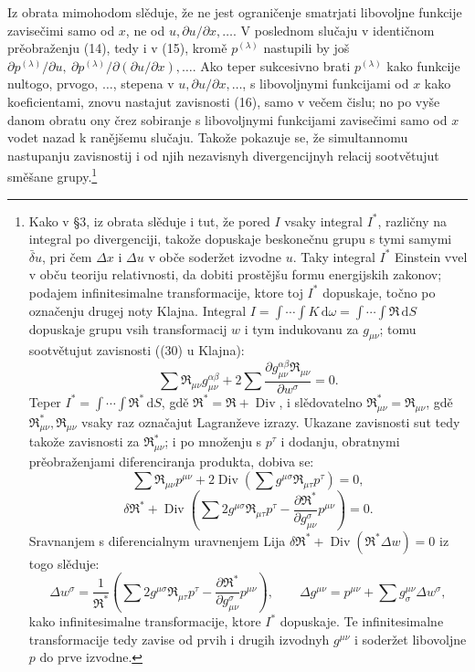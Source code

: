 \documentclass[11pt]{article}
\providecommand{\D}{\Delta}
\providecommand{\p}{\partial}
\providecommand{\dd}{\mathrm d}
\DeclareMathOperator{\Div}{Div}
\providecommand{\bd}{\bar{\delta}}
\begin{document}
Iz obrata mimohodom slěduje, že ne jest ograničenje smatrjati libovoljne funkcije zavisečimi samo od \(x\), ne od \(u,\p u/\p x,\ldots\). V poslednom slučaju v identičnom prěobraženju (14), tedy i v (15), kromě \(p^{(\lambda)}\) nastupili by još \(\p p^{(\lambda)}/\p u,\ \p p^{(\lambda)}/\p(\p u/\p x),\ldots\). Ako teper sukcesivno brati \(p^{(\lambda)}\) kako funkcije nultogo, prvogo, \(\ldots\), stepena v \(u,\p u/\p x,\ldots\), s libovoljnymi funkcijami od \(x\) kako koeficientami, znovu nastajut zavisnosti (16), samo v večem čislu; no po vyše danom obratu ony črez sobiranje s libovoljnymi funkcijami zavisečimi samo od \(x\) vodet nazad k ranějšemu slučaju. Takože pokazuje se, že simultannomu nastupanju zavisnostij i od njih nezavisnyh divergencijnyh relacij sootvětujut směšane grupy.\footnote{Kako v \S{}3, iz obrata slěduje i tut, že pored \(I\) vsaky integral \(I^*\), različny na integral po divergenciji, takože dopuskaje beskonečnu grupu s tymi samymi \(\bd u\), pri čem \(\D x\) i \(\D u\) v obče soderžet izvodne \(u\). Taky integral \(I^*\) Einstein vvel v obču teoriju relativnosti, da dobiti prostějšu formu energijskih zakonov; podajem infinitesimalne transformacije, ktore toj \(I^*\) dopuskaje, točno po označenju drugej noty Klajna. Integral \(I=\int\!\cdots\!\int K\,\dd\omega=\int\!\cdots\!\int \mathfrak{R}\,\dd S\) dopuskaje grupu vsih transformacij \(w\) i tym indukovanu za \(g_{\mu\nu}\); tomu sootvětujut zavisnosti ((30) u Klajna):
\[
\sum \mathfrak{R}_{\mu\nu}g_{\mu\nu}^{\alpha\beta}
+2\sum\frac{\p g_{\mu\nu}^{\alpha\beta}\mathfrak{R}_{\mu\nu}}{\p w^\sigma}=0.
\]
Teper \(I^*=\int\!\cdots\!\int \mathfrak{R}^*\,\dd S\), gdě \(\mathfrak{R}^*=\mathfrak{R}+\Div\), i slědovatelno \(\mathfrak{R}_{\mu\nu}^*=\mathfrak{R}_{\mu\nu}\), gdě \(\mathfrak{R}_{\mu\nu}^*,\mathfrak{R}_{\mu\nu}\) vsaky raz označajut Lagranževe izrazy. Ukazane zavisnosti sut tedy takože zavisnosti za \(\mathfrak{R}_{\mu\nu}^*\); i po množenju s \(p^\tau\) i dodanju, obratnymi prěobraženjami diferenciranja produkta, dobiva se:
\[
\sum \mathfrak{R}_{\mu\nu}p^{\mu\nu}
+2\Div\!\left(\sum g^{\mu\sigma}\mathfrak{R}_{\mu\tau}p^\tau\right)=0,
\]
\[
\delta\mathfrak{R}^*+\Div\!\left(\sum 2g^{\mu\sigma}\mathfrak{R}_{\mu\tau}p^\tau
-\frac{\p\mathfrak{R}^*}{\p g_{\mu\nu}^{\sigma}}p^{\mu\nu}\right)=0.
\]
Sravnanjem s diferencialnym uravnenjem Lija \(\delta\mathfrak{R}^*+\Div(\mathfrak{R}^*\D w)=0\) iz togo slěduje:
\[
\D w^\sigma=\frac1{\mathfrak{R}^*}\left(\sum 2g^{\mu\sigma}\mathfrak{R}_{\mu\tau}p^\tau
-\frac{\p\mathfrak{R}^*}{\p g_{\mu\nu}^{\sigma}}p^{\mu\nu}\right),
\qquad
\D g^{\mu\nu}=p^{\mu\nu}+\sum g^{\mu\nu}_{\sigma}\D w^\sigma,
\]
kako infinitesimalne transformacije, ktore \(I^*\) dopuskaje. Te infinitesimalne transformacije tedy zavise od prvih i drugih izvodnyh \(g^{\mu\nu}\) i soderžet libovoljne \(p\) do prve izvodne.}
\end{document}
